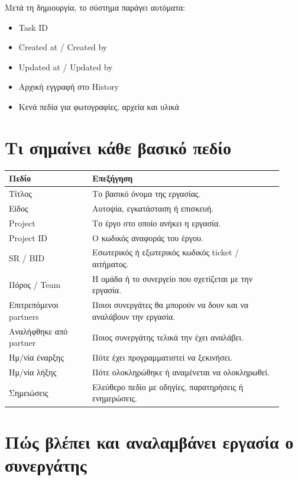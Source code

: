 \documentclass[11pt,a4paper]{article}
\begin{document}
Μετά τη δημιουργία, το σύστημα παράγει αυτόματα:

\begin{itemize}
  \item Task ID
  \item Created at / Created by
  \item Updated at / Updated by
  \item Αρχική εγγραφή στο History
  \item Κενά πεδία για φωτογραφίες, αρχεία και υλικά
\end{itemize}

\section{Τι σημαίνει κάθε βασικό πεδίο}

\begin{longtable}{|>{\raggedright\arraybackslash}p{0.28\linewidth}|>{\raggedright\arraybackslash}p{0.64\linewidth}|}
\hline
\textbf{Πεδίο} & \textbf{Επεξήγηση} \\
\hline
Τίτλος & Το βασικό όνομα της εργασίας. \\
\hline
Είδος & Αυτοψία, εγκατάσταση ή επισκευή. \\
\hline
Project & Το έργο στο οποίο ανήκει η εργασία. \\
\hline
Project ID & Ο κωδικός αναφοράς του έργου. \\
\hline
SR / BID & Εσωτερικός ή εξωτερικός κωδικός ticket / αιτήματος. \\
\hline
Πόρος / Team & Η ομάδα ή το συνεργείο που σχετίζεται με την εργασία. \\
\hline
Επιτρεπόμενοι partners & Ποιοι συνεργάτες θα μπορούν να δουν και να αναλάβουν την εργασία. \\
\hline
Αναλήφθηκε από partner & Ποιος συνεργάτης τελικά την έχει αναλάβει. \\
\hline
Ημ/νία έναρξης & Πότε έχει προγραμματιστεί να ξεκινήσει. \\
\hline
Ημ/νία λήξης & Πότε ολοκληρώθηκε ή αναμένεται να ολοκληρωθεί. \\
\hline
Σημειώσεις & Ελεύθερο πεδίο με οδηγίες, παρατηρήσεις ή ενημερώσεις. \\
\hline
\end{longtable}

\section{Πώς βλέπει και αναλαμβάνει εργασία ο συνεργάτης}
\end{document}
